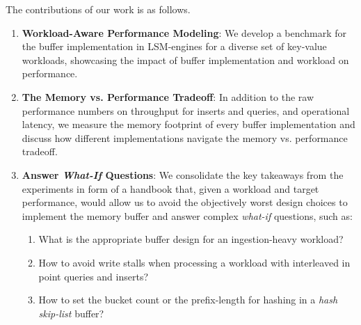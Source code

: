 The contributions of our work is as follows.
\begin{enumerate}[leftmargin=*,labelindent=0mm, itemsep=0.2\baselineskip]
    \item \textbf{Workload-Aware Performance Modeling}: We develop a benchmark for the buffer implementation in LSM-engines for a diverse set of key-value workloads, showcasing the impact of buffer implementation and workload on performance.  
    \item \textbf{The Memory vs. Performance Tradeoff}: In addition to the raw performance numbers on throughput for inserts and queries, and operational latency, we measure the memory footprint of every buffer implementation and discuss how different implementations navigate the memory vs. performance tradeoff. 

    \item \textbf{Answer \textit{What-If} Questions}: We consolidate the key takeaways from the experiments in form of a handbook that, given a workload and target performance, would allow us to avoid the objectively worst design choices to implement the memory buffer and answer complex \textit{what-if} questions, such as: 
    \begin{enumerate}[label=(\alph*),leftmargin=*,labelindent=0mm, itemsep=0.2\baselineskip]
        \item What is the appropriate buffer design for an ingestion-heavy workload?
        \item How to avoid write stalls when processing a workload with interleaved in point queries and inserts?
        \item How to set the bucket count or the prefix-length for hashing in a \textit{hash skip-list} buffer?
    \end{enumerate}
\end{enumerate}

